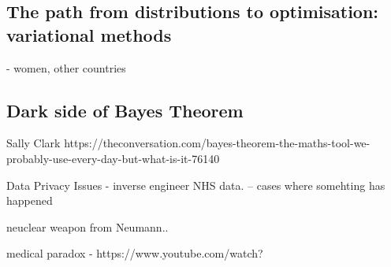 






\subsection{The path from distributions to optimisation: variational methods}

- women, other countries




\subsection{Dark side of Bayes Theorem}

Sally Clark 
https://theconversation.com/bayes-theorem-the-maths-tool-we-probably-use-every-day-but-what-is-it-76140


Data Privacy Issues - inverse engineer NHS data.
-- cases where somehting has happened 

neuclear weapon from Neumann.. 

medical paradox - https://www.youtube.com/watch?